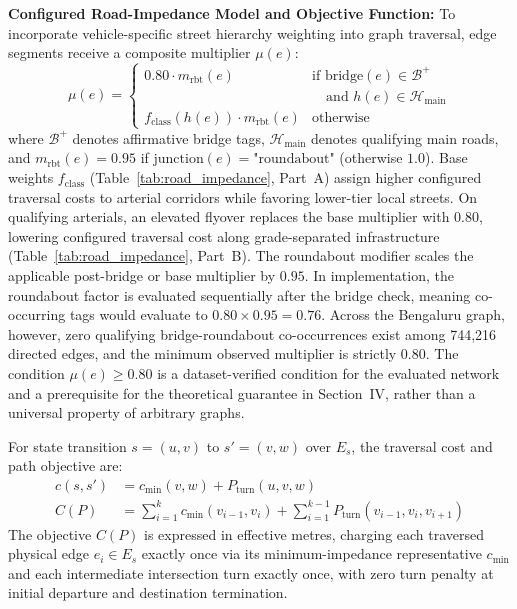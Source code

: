 \documentclass[conference]{IEEEtran}
\begin{document}
\noindent\textbf{Configured Road-Impedance Model and Objective Function:} To incorporate vehicle-specific street hierarchy weighting into graph traversal, edge segments receive a composite multiplier $\mu(e)$:
\begin{equation}
\label{eq:road_impedance}
\mu(e) = \begin{cases}
0.80 \cdot m_{\text{rbt}}(e) & \text{if } \text{bridge}(e) \in \mathcal{B}^+ \\
& \quad \text{and } h(e) \in \mathcal{H}_{\text{main}} \\
f_{\text{class}}(h(e)) \cdot m_{\text{rbt}}(e) & \text{otherwise}
\end{cases}
\end{equation}
where $\mathcal{B}^+$ denotes affirmative bridge tags, $\mathcal{H}_{\text{main}}$ denotes qualifying main roads, and $m_{\text{rbt}}(e) = 0.95$ if $\text{junction}(e) = \text{"roundabout"}$ (otherwise $1.0$). Base weights $f_{\text{class}}$ (Table~\ref{tab:road_impedance}, Part~A) assign higher configured traversal costs to arterial corridors while favoring lower-tier local streets. On qualifying arterials, an elevated flyover replaces the base multiplier with $0.80$, lowering configured traversal cost along grade-separated infrastructure (Table~\ref{tab:road_impedance}, Part~B). The roundabout modifier scales the applicable post-bridge or base multiplier by $0.95$. In implementation, the roundabout factor is evaluated sequentially after the bridge check, meaning co-occurring tags would evaluate to $0.80 \times 0.95 = 0.76$. Across the Bengaluru graph, however, zero qualifying bridge-roundabout co-occurrences exist among 744,216 directed edges, and the minimum observed multiplier is strictly $0.80$. The condition $\mu(e) \ge 0.80$ is a dataset-verified condition for the evaluated network and a prerequisite for the theoretical guarantee in Section~IV, rather than a universal property of arbitrary graphs.

For state transition $s = (u, v)$ to $s' = (v, w)$ over $E_s$, the traversal cost and path objective are:
\begin{equation}
\label{eq:path_objective}
\begin{aligned}
c(s, s') &= c_{\min}(v, w) + P_{\text{turn}}(u, v, w) \\
C(P) &= \sum_{i=1}^k c_{\min}(v_{i-1}, v_i) + \sum_{i=1}^{k-1} P_{\text{turn}}(v_{i-1}, v_i, v_{i+1})
\end{aligned}
\end{equation}
The objective $C(P)$ is expressed in effective metres, charging each traversed physical edge $e_i \in E_s$ exactly once via its minimum-impedance representative $c_{\min}$ and each intermediate intersection turn exactly once, with zero turn penalty at initial departure and destination termination.
\end{document}
